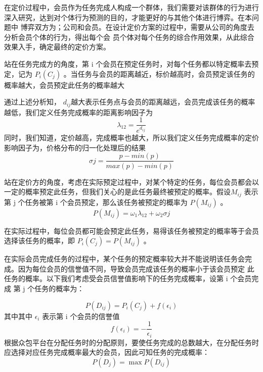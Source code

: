 \documentclass{cumcmthesis}
\begin{document}
在定价过程中，会员作为任务完成人构成一个群体，我们需要对该群体的行为进行 深入研究，达到对个体行为预测的目的，才能更好的与其他个体进行博弈。在本问题中 博弈双方为；公司和会员。在设计定价方案的过程中，需要从公司的角度去分析会员个体的行为，得出每个会 员个体对每个任务的综合作用效果，从此综合效果入手，确定最终的定价方案。

站在任务完成方的角度，第 i 个会员在预定任务时，对每个任务都以特定概率去预 定，记为 $P_i(C_j)$ 。当任务与会员的距离越近，标价越高时，会员预定该任务的概率越大，会员预定此任务的概率越大

通过上述分析知， $d_{ij}$越大表示任务点与会员的距离越远，会员完成该任务的概率越低，我们定义任务完成概率的距离影响因子为
\begin{equation}
\left.
\lambda_{12}=\frac{1}{e^{d_{ij}}}
\right.
\end{equation} 
同时，我们知道，定价越高，完成概率也越大，所以我们定义任务完成概率的定价影响因子为，价格分布的归一化处理后的结果
\begin{equation}
\left.
\sigma{j}=\frac{p-min(p)}{max(p)-min(p)}
\right.
\end{equation} 

站在定价方的角度，考虑在实际预定过程中，对某个特定的任务，每位会员都会以 一定的概率预定此任务，但我们关心的是此任务最终被预定的概率。假设$M_{ij}$ 表示第 j 个任务被第 i 个会员预定，那么该任务被预定的概率为 $P(M_{ij})$ 。
\begin{equation}
\left.
P(M_{ij})=\omega_1\lambda_{12}+\omega_2\sigma{j}
\right.
\end{equation}




在实际过程中，每位会员都可能会预定此任务，易得该任务被预定的概率等于会员 选择该任务的概率，即 $P_i(C_j)=P(M_{ij})$ 。

在实际会员完成任务的过程中，某个任务的预定概率较大并不能说明该任务会完成。因为每位会员的信誉值不同，导致会员完成该任务的概率小于该会员预定 此任务的概率。以下我们考虑受会员信誉值影响下的任务完成概率，设第 i 个会员完成 第 j 个任务的概率为： 

\begin{equation}
\left.
P\left( D_{ij}  \right)=P_i(C_j)+ f\left(\epsilon_i\right)
\right.
\end{equation}
其中其中 $\epsilon_i$ 表示第 i 个会员的信誉值
\begin{equation}
\left.f\left(\epsilon_i\right)=-\frac{1}{\epsilon_i}
\right.
\end{equation}
根据众包平台在分配任务时的分配原则，要使任务完成的总数越大，在分配任务时 应选择对应任务完成概率最大的会员，因此可知任务的完成概率：
\begin{equation}
\left.
P\left( D_{j}  \right)=\max P\left( D_{ij} \right)
\right.
\end{equation}
\end{document}
